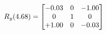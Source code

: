 \documentclass[preview]{standalone}
\begin{document}
\begin{align*}
\special{dvisvgm:raw <g id='unique000'>}R_{y}(4.68) = \begin{bmatrix}-0.03 & 0 & -1.00 \\0 & 1 & 0 \\+1.00 & 0 & -0.03\end{bmatrix}\special{dvisvgm:raw </g>}
\end{align*}
\end{document}
